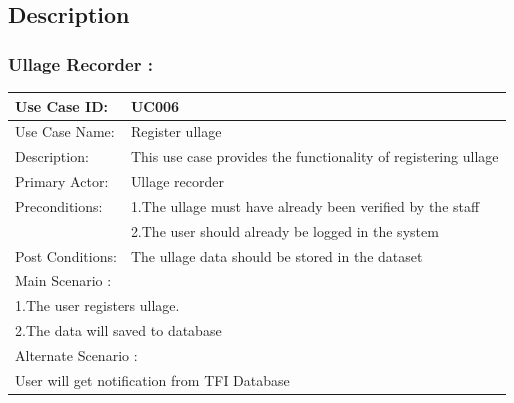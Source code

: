 \nopagebreak

	\subsection{Description}
	\subsubsection{Ullage Recorder :}
	\begin{center}
	\vspace*{1\baselineskip}	
	\begin{tabular}{|l|p{10cm}|}
		\hline
		Use Case ID: & UC006 \\
		\hline
		Use Case Name: & Register ullage \\
		\hline
		Description: & This use case provides the functionality of registering ullage \\
		\hline
		Primary Actor: & Ullage recorder \\
		\hline
		Preconditions: & 1.The ullage must have already been verified by the staff\\ 
		& 2.The user should already be logged in the system \\
		\hline
		Post Conditions: & The ullage data should be stored in the dataset\\
		\hline
		\multicolumn{2}{|l|}{Main Scenario :} \\
		\hline
		\multicolumn{2}{|l|}{1.The user registers ullage.} \\
		\multicolumn{2}{|l|}{2.The data will saved to database} \\
		\hline
		\multicolumn{2}{|l|}{Alternate Scenario :} \\
		\hline
		\multicolumn{2}{|l|}{User will get notification from TFI Database} \\
		\hline
	\end{tabular}
\end{center}
	
